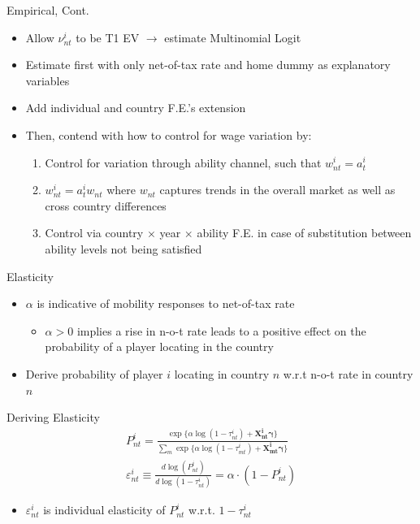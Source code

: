 \documentclass[aspectratio=169,professionalfonts]{beamer}
\begin{document}
\begin{frame}{Empirical, Cont.}
  \begin{itemize}
    \item Allow $\nu_{nt}^i$ to be T1 EV $\rightarrow$ estimate Multinomial Logit
    \item Estimate first with only net-of-tax rate and home dummy as explanatory variables
    \item Add individual and country F.E.'s extension
    \item Then, contend with how to control for wage variation by:
    \begin{enumerate}
      \item Control for variation through ability channel, such that $w_{nt}^i = a_t^i$
      \item $w_{nt}^i = a_{t}^iw_{nt}$ where $w_{nt}$ captures trends in the overall market as well as cross country differences
      \item Control via country $\times$ year $\times$ ability F.E. in case of substitution between ability levels not being satisfied
    \end{enumerate}
  \end{itemize}
\end{frame}

\begin{frame}{Elasticity}
  \begin{itemize}
    \item $\alpha$ is indicative of mobility responses to net-of-tax rate
    \begin{itemize}
      \item $\alpha>0$ implies a rise in n-o-t rate leads to a positive effect on the probability of a player locating in the country
    \end{itemize}
    \item Derive probability of player $i$ locating in country $n$ w.r.t n-o-t rate in country $n$
  \end{itemize}
\end{frame}

\begin{frame}{Deriving Elasticity}
  \begin{gather*}
    P_{nt}^i = \frac{\exp\{\alpha\log(1-\tau_{nt}^i)+\mathbf{X^i_{nt}\gamma}\}}{\sum_m\exp\{\alpha\log(1-\tau_{mt}^i)+\mathbf{X_{mt}^i\gamma}\}} \\
    \varepsilon_{nt}^i\equiv\frac{d\log(P_{nt}^i)}{d\log(1-\tau_{nt}^i)} = \alpha\cdot(1-P_{nt}^i)
  \end{gather*}
  \begin{itemize}
    \item $\varepsilon_{nt}^i$ is individual elasticity of $P_{nt}^i$ w.r.t. $1-\tau_{nt}^i$
  \end{itemize}
\end{frame}
    
\end{document}
